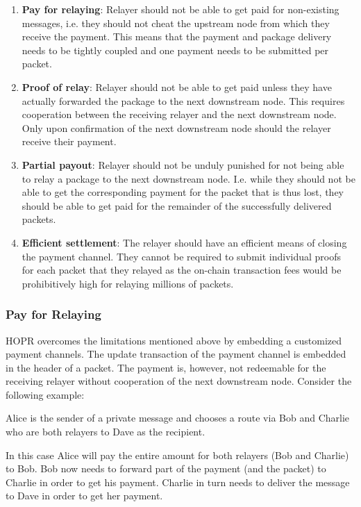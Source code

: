 \documentclass{article}
\begin{document}
\begin{enumerate}
    \item \textbf{Pay for relaying}: Relayer should not be able to get paid for non-existing messages, i.e. they should not cheat the upstream node from which they receive the payment. This means that the payment and package delivery needs to be tightly coupled and one payment needs to be submitted per packet.
    \item \textbf{Proof of relay}: Relayer should not be able to get paid unless they have actually forwarded the package to the next downstream node. This requires cooperation between the receiving relayer and the next downstream node. Only upon confirmation of the next downstream node should the relayer receive their payment.
    \item \textbf{Partial payout}: Relayer should not be unduly punished for not being able to relay a package to the next downstream node. I.e. while they should not be able to get the corresponding payment for the packet that is thus lost, they should be able to get paid for the remainder of the successfully delivered packets.
    \item \textbf{Efficient settlement}: The relayer should have an efficient means of closing the payment channel. They cannot be required to submit individual proofs for each packet that they relayed as the on-chain transaction fees would be prohibitively high for relaying millions of packets.
\end{enumerate}

\subsubsection{Pay for Relaying}
HOPR overcomes the limitations mentioned above by embedding a customized payment channels. The update transaction of the payment channel is embedded in the header of a packet. The payment is, however, not redeemable for the receiving relayer without cooperation of the next downstream node. Consider the following example:

Alice is the sender of a private message and chooses a route via Bob and Charlie who are both relayers to Dave as the recipient.

In this case Alice will pay the entire amount for both relayers (Bob and Charlie) to Bob. Bob now needs to forward part of the payment (and the packet) to Charlie in order to get his payment. Charlie in turn needs to deliver the message to Dave in order to get her payment.
\end{document}
